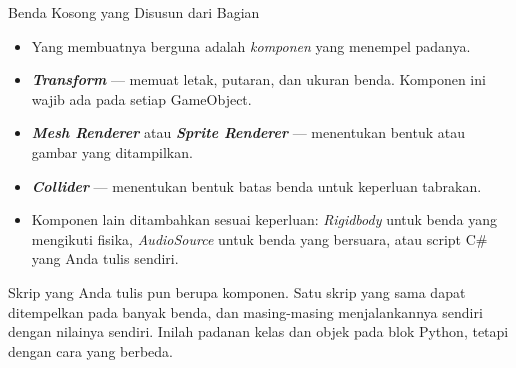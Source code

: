 \documentclass[aspectratio=169,10pt]{beamer}
\begin{document}
\begin{frame}{Benda Kosong yang Disusun dari Bagian}
\begin{itemize}
  \item Yang membuatnya berguna adalah \emph{komponen} yang menempel padanya.
  \item \textbf{\emph{Transform}} --- memuat letak, putaran, dan ukuran benda.
        Komponen ini wajib ada pada setiap GameObject.
  \item \textbf{\emph{Mesh Renderer}} atau \textbf{\emph{Sprite Renderer}} ---
        menentukan bentuk atau gambar yang ditampilkan.
  \item \textbf{\emph{Collider}} --- menentukan bentuk batas benda untuk
        keperluan tabrakan.
  \item Komponen lain ditambahkan sesuai keperluan: \emph{Rigidbody} untuk
        benda yang mengikuti fisika, \emph{AudioSource} untuk benda yang
        bersuara, atau script C\# yang Anda tulis sendiri.
\end{itemize}
\vspace{0.14cm}
\begin{kotak}
Skrip yang Anda tulis pun berupa komponen. Satu skrip yang sama dapat
ditempelkan pada banyak benda, dan masing-masing menjalankannya sendiri dengan
nilainya sendiri. Inilah padanan kelas dan objek pada blok Python, tetapi
dengan cara yang berbeda.
\end{kotak}
\end{frame}
\end{document}
